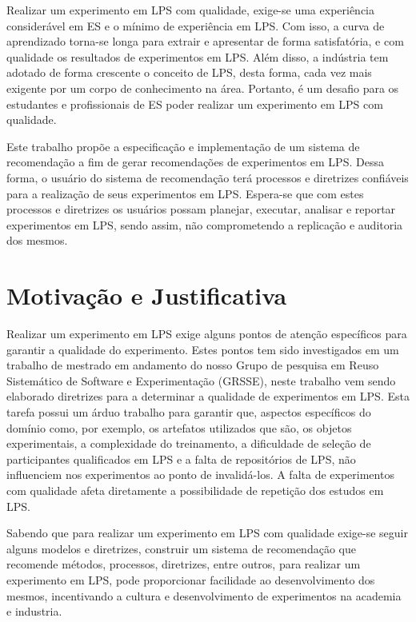Realizar um experimento em LPS com qualidade, exige-se uma experiência considerável em ES e o mínimo de experiência em LPS. Com isso, a curva de aprendizado torna-se longa para extrair e apresentar de forma satisfatória, e com qualidade os resultados de experimentos em LPS. Além disso, a indústria tem adotado de forma crescente o conceito de LPS, desta forma, cada vez mais exigente por um corpo de conhecimento na área. Portanto, é um desafio para os estudantes e profissionais de ES poder realizar um experimento em LPS com qualidade.

Este trabalho propõe a especificação e implementação de um sistema de recomendação a fim de gerar recomendações de experimentos em LPS. Dessa forma, o usuário do sistema de recomendação terá processos e diretrizes confiáveis para a realização de seus experimentos em LPS. Espera-se que com estes processos e diretrizes os usuários possam planejar, executar, analisar e reportar experimentos em LPS, sendo assim, não comprometendo a replicação e auditoria dos mesmos.

\section{Motivação e Justificativa}
\label{sec:motivacao}
Realizar um experimento em LPS exige alguns pontos de atenção específicos para garantir a qualidade do experimento. Estes pontos tem sido investigados em um trabalho de mestrado em andamento do nosso Grupo de pesquisa em Reuso Sistemático de Software e Experimentação (GRSSE), neste trabalho vem sendo elaborado diretrizes para a determinar a qualidade de experimentos em LPS. Esta tarefa possui um árduo trabalho para garantir que, aspectos específicos do domínio como, por exemplo, os artefatos utilizados que são, os objetos experimentais, a complexidade do treinamento, a dificuldade de seleção de participantes qualificados em LPS e a falta de repositórios de LPS, não influenciem nos experimentos ao ponto de invalidá-los. A falta de experimentos com qualidade afeta diretamente a possibilidade de repetição dos estudos em LPS.

Sabendo que para realizar um experimento em LPS com qualidade exige-se seguir alguns modelos e diretrizes, construir um sistema de recomendação que recomende métodos, processos, diretrizes, entre outros, para realizar um experimento em LPS, pode proporcionar facilidade ao desenvolvimento dos mesmos, incentivando a cultura e desenvolvimento de experimentos na academia e industria.

